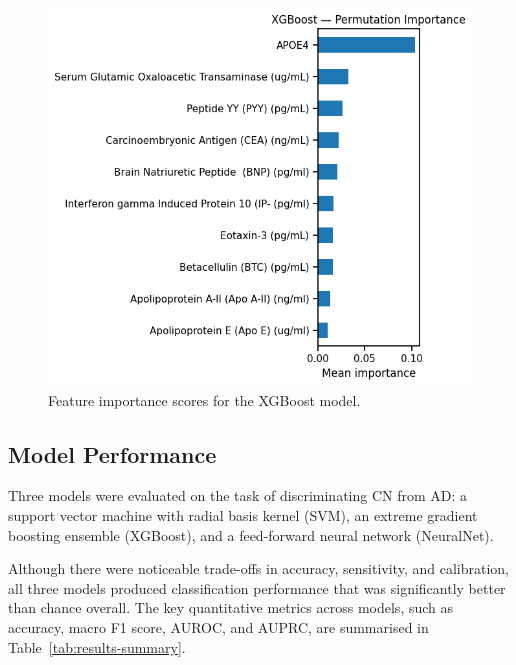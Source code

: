 \documentclass[a4paper,12pt]{article}
\begin{document}
\begin{figure}[H]
\begin{minipage}{0.48\textwidth}
    \includegraphics[width=\textwidth]{Pics/xgboost_importance.png}
    \caption{Feature importance scores for the XGBoost model.}
    \label{fig:xgboost-importance}
\end{minipage}
\end{figure}


\subsection{Model Performance}
Three models were evaluated on the task of discriminating CN from AD: a support vector machine with radial basis kernel (SVM), an extreme gradient boosting ensemble (XGBoost), and a feed-forward neural network (NeuralNet).  

Although there were noticeable trade-offs in accuracy, sensitivity, and calibration, all three models produced classification performance that was significantly better than chance overall.  The key quantitative metrics across models, such as accuracy, macro F1 score, AUROC, and AUPRC, are summarised in Table~\ref{tab:results-summary}. 
\end{document}
